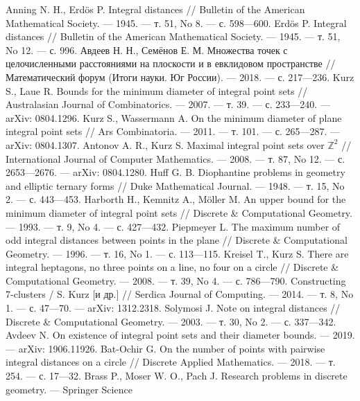 \begin{thebibliography}{99}
Anning N. H., Erdös P. Integral distances // Bulletin of the American Mathematical
Society. — 1945. — т. 51, No 8. — с. 598—600.
Erdös P. Integral distances // Bulletin of the American Mathematical Society. — 1945. —
т. 51, No 12. — с. 996.
Авдеев Н. Н., Семёнов Е. М. Множества точек с целочисленными расстояниями на
плоскости и в евклидовом пространстве // Математический форум (Итоги науки. Юг
России). — 2018. — с. 217—236.
Kurz S., Laue R. Bounds for the minimum diameter of integral point sets // Australasian
Journal of Combinatorics. — 2007. — т. 39. — с. 233—240. — arXiv: 0804.1296.
Kurz S., Wassermann A. On the minimum diameter of plane integral point sets // Ars
Combinatoria. — 2011. — т. 101. — с. 265—287. — arXiv: 0804.1307.
Antonov A. R., Kurz S. Maximal integral point sets over $\mathbb{Z}^2$ // International Journal of
Computer Mathematics. — 2008. — т. 87, No 12. — с. 2653—2676. — arXiv: 0804.1280.
Huff G. B. Diophantine problems in geometry and elliptic ternary forms // Duke
Mathematical Journal. — 1948. — т. 15, No 2. — с. 443—453.
Harborth H., Kemnitz A., Möller M. An upper bound for the minimum diameter of integral
point sets // Discrete \& Computational Geometry. — 1993. — т. 9, No 4. — с. 427—432.
Piepmeyer L. The maximum number of odd integral distances between points in the plane //
Discrete \& Computational Geometry. — 1996. — т. 16, No 1. — с. 113—115.
Kreisel T., Kurz S. There are integral heptagons, no three points on a line, no four on a
circle // Discrete \& Computational Geometry. — 2008. — т. 39, No 4. — с. 786—790.
Constructing 7-clusters / S. Kurz [и др.] // Serdica Journal of Computing. — 2014. — т. 8,
No 1. — с. 47—70. — arXiv: 1312.2318.
Solymosi J. Note on integral distances // Discrete \& Computational Geometry. — 2003. —
т. 30, No 2. — с. 337—342.
Avdeev N. On existence of integral point sets and their diameter bounds. — 2019. — arXiv:
1906.11926.
Bat-Ochir G. On the number of points with pairwise integral distances on a circle // Discrete
Applied Mathematics. — 2018. — т. 254. — с. 17—32.
Brass P., Moser W. O., Pach J. Research problems in discrete geometry. — Springer Science

\end{thebibliography}
